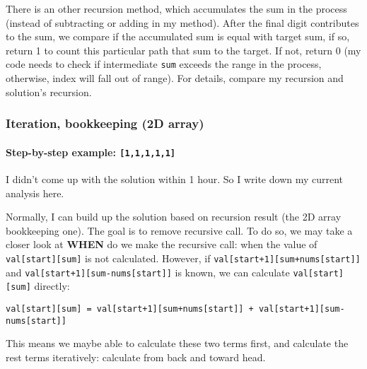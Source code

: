 \documentclass[12pt]{article}
\begin{document}
There is an other recursion method, which accumulates the sum in the process (instead of subtracting or adding in my method). After the final digit contributes to the sum, we compare if the accumulated sum is equal with target sum, if so, return 1 to count this particular path that sum to the target. If not, return 0 (my code needs to check if intermediate \texttt{sum} exceeds the range in the process, otherwise, index will fall out of range). For details, compare my recursion and solution's recursion.

\subsubsection{Iteration, bookkeeping (2D array)}
\label{sec:org8efcc42}
\paragraph{Step-by-step example: \texttt{[1,1,1,1,1]}}
\label{sec:org38a6275}

I didn't come up with the solution within 1 hour. So I write down my current analysis here.

Normally, I can build up the solution based on recursion result (the 2D array bookkeeping one). The goal is to remove recursive call. To do so, we may take a closer look at \textbf{WHEN} do we make the recursive call: when the value of \texttt{val[start][sum]} is not calculated. However, if \texttt{val[start+1][sum+nums[start]]} and \texttt{val[start+1][sum-nums[start]]} is known, we can calculate \texttt{val[start][sum]} directly:
\begin{verbatim}
val[start][sum] = val[start+1][sum+nums[start]] + val[start+1][sum-nums[start]]
\end{verbatim}
This means we maybe able to calculate these two terms first, and calculate the rest terms iteratively: calculate from back and toward head.
\end{document}
